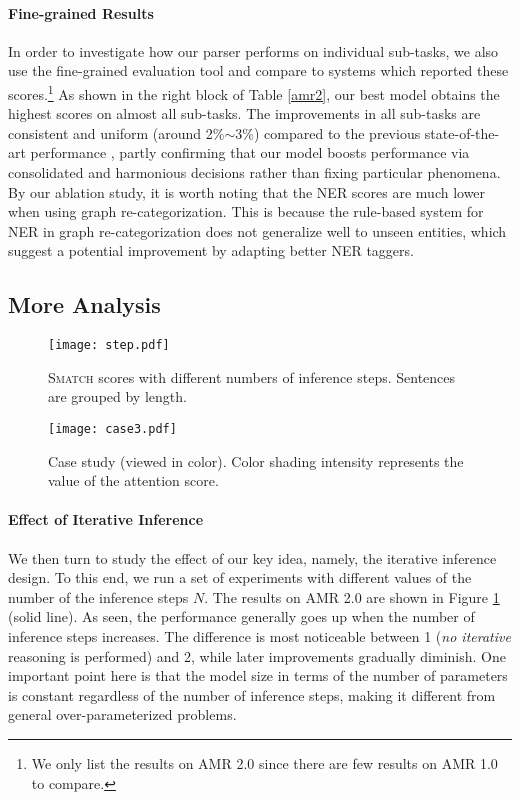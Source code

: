 \documentclass[11pt,a4paper]{article}
\begin{document}
	\paragraph{Fine-grained Results} In order to investigate how our parser performs on individual sub-tasks, we also use the fine-grained evaluation tool \cite{damonte2016incremental} and compare to systems which reported these scores.\footnote{We only list the results on AMR 2.0 since there are few results on AMR 1.0 to compare.} As shown in the right block of Table \ref{amr2}, our best model obtains the highest scores on almost all sub-tasks. The improvements in all sub-tasks are consistent and uniform (around 2\%$\sim$3\%) compared to the previous state-of-the-art performance \cite{zhang-etal-2019-broad}, partly confirming that our model boosts performance via consolidated and harmonious decisions rather than fixing particular phenomena. By our ablation study, it is worth noting that the NER scores are much lower when using graph re-categorization. This is because the rule-based system for NER in graph re-categorization does not generalize well to unseen entities, which suggest a potential improvement by adapting better NER taggers.
	\subsection{More Analysis}
		\begin{figure}[t]
		\centering
		\texttt{[image: step.pdf]}
		\caption{\textsc{Smatch} scores with different numbers of inference steps. Sentences are grouped by length.}
		\label{step}
	\end{figure}
	\begin{figure*}[t]
		\centering
		\texttt{[image: case3.pdf]}
		\caption{Case study (viewed in color). Color shading intensity represents the value of the attention score.}
		\label{case}
	\end{figure*}
	\paragraph{Effect of Iterative Inference}
	We then turn to study the effect of our key idea, namely, the iterative inference design. To this end, we run a set of experiments with different values of the number of the inference steps $N$. The results on AMR 2.0 are shown in Figure \ref{step} (solid line). As seen, the performance generally goes up when the number of inference steps increases. The difference is most noticeable between 1 (\textit{no iterative} reasoning is performed) and 2, while later improvements gradually diminish. One important point here is that the model size in terms of the number of parameters is constant regardless of the number of inference steps, making it different from general over-parameterized problems.
	
\end{document}
